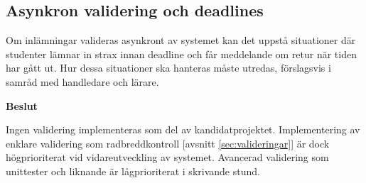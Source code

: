 \subsection{Asynkron validering och deadlines}

Om inlämningar valideras asynkront av systemet kan det uppstå situationer där studenter lämnar in strax innan deadline och får meddelande om retur när tiden har gått ut. Hur dessa situationer ska hanteras måste utredas, förslagsvis i samråd med handledare och lärare.

\begin{flushright}

  \textbf{Beslut}

Ingen validering implementeras som del av kandidatprojektet. Implementering av enklare validering som radbreddkontroll [avsnitt \ref{sec:valideringar}] är dock högprioriterat vid vidareutveckling av systemet. Avancerad validering som unittester och liknande är lågprioriterat i skrivande stund.

\end{flushright}
